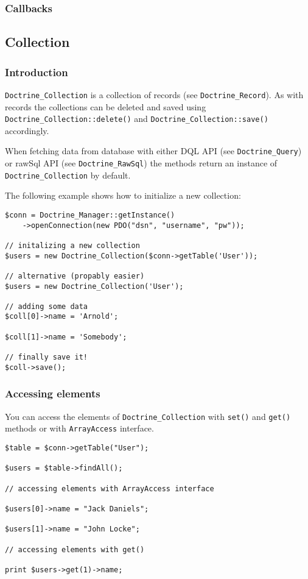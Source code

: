 \documentclass[11pt,a4paper]{report}
\begin{document}
\subsubsection{Callbacks}
\subsection{Collection}
\subsubsection{Introduction}
\texttt{Doctrine\_Collection} is a collection of records (see \texttt{Doctrine\_Record}). As with records the collections can be deleted and saved using \texttt{Doctrine\_Collection::delete()} and \texttt{Doctrine\_Collection::save()} accordingly.

When fetching data from database with either DQL API (see \texttt{Doctrine\_Query}) or rawSql API (see \texttt{Doctrine\_RawSql}) the methods return an instance of \texttt{Doctrine\_Collection} by default.

The following example shows how to initialize a new collection:

\begin{verbatim}
$conn = Doctrine_Manager::getInstance()
    ->openConnection(new PDO("dsn", "username", "pw"));

// initalizing a new collection
$users = new Doctrine_Collection($conn->getTable('User'));

// alternative (propably easier)
$users = new Doctrine_Collection('User');

// adding some data
$coll[0]->name = 'Arnold';

$coll[1]->name = 'Somebody';

// finally save it!
$coll->save();
\end{verbatim}

\subsubsection{Accessing elements}
You can access the elements of \texttt{Doctrine\_Collection} with \texttt{set()} and \texttt{get()} methods or with \texttt{ArrayAccess} interface.

\begin{verbatim}
$table = $conn->getTable("User");

$users = $table->findAll();

// accessing elements with ArrayAccess interface

$users[0]->name = "Jack Daniels";

$users[1]->name = "John Locke";

// accessing elements with get()

print $users->get(1)->name;
\end{verbatim}
\end{document}
